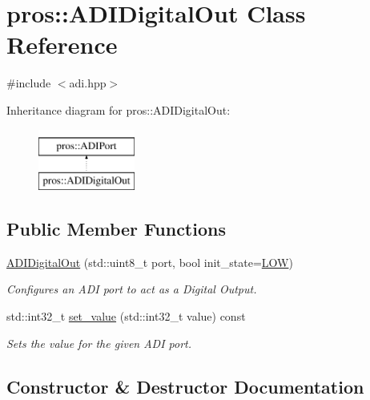 \hypertarget{classpros_1_1ADIDigitalOut}{}\section{pros\+::A\+D\+I\+Digital\+Out Class Reference}
\label{classpros_1_1ADIDigitalOut}


{\ttfamily \#include $<$adi.\+hpp$>$}

Inheritance diagram for pros\+::A\+D\+I\+Digital\+Out\+:\begin{figure}[H]
\begin{center}
\leavevmode
\includegraphics[height=2.000000cm]{classpros_1_1ADIDigitalOut}
\end{center}
\end{figure}
\subsection*{Public Member Functions}
\begin{DoxyCompactItemize}
\item 
\mbox{\hyperlink{classpros_1_1ADIDigitalOut_a1c5dbea7f767418550df8007cfb0d221}{A\+D\+I\+Digital\+Out}} (std\+::uint8\+\_\+t port, bool init\+\_\+state=\mbox{\hyperlink{adi_8h_ab811d8c6ff3a505312d3276590444289}{L\+OW}})
\begin{DoxyCompactList}\small\item\em Configures an A\+DI port to act as a Digital Output. \end{DoxyCompactList}\item 
std\+::int32\+\_\+t \mbox{\hyperlink{classpros_1_1ADIDigitalOut_ae6711117fbceb3bb6e3602c4ef63aff1}{set\+\_\+value}} (std\+::int32\+\_\+t value) const
\begin{DoxyCompactList}\small\item\em Sets the value for the given A\+DI port. \end{DoxyCompactList}\end{DoxyCompactItemize}


\subsection{Constructor \& Destructor Documentation}
\mbox{\label{classpros_1_1ADIDigitalOut_a1c5dbea7f767418550df8007cfb0d221}} 

